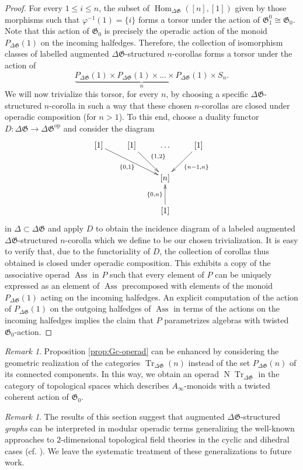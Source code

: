\documentclass[english,11pt,leqno]{article}
\def\Gen{\mathfrak{G}}
\def\Hom{\operatorname{Hom}}
\def\on{\operatorname}
\def\op{{\operatorname{op}}}
\def\Hom{\operatorname{Hom}}
\def\N{\operatorname{N}}
\def\Tr{\on{Tr}}
\def\DG{ {\Delta \Gen}}
\theoremstyle{definition}
\theoremstyle{remark}
\newtheorem{rem}[thm]{Remark}
\numberwithin{equation}{section}
\begin{document}
\begin{proof}
	For every $1 \le i \le n$, the subset of $\Hom_{\DG}([n],[1])$ given by those morphisms such
	that $\varphi^{-1}(1) = \{i\}$ forms a torsor under the action of $\Gen_1^0 \cong \Gen_0$. 
	Note that this action of $\Gen_0$ is precisely the operadic action of the monoid
	$P_{\DG}(1)$ on the incoming halfedges. Therefore, the collection of isomorphism classes of
	labelled augmented $\DG$-structured $n$-corollas forms a torsor under the action of 
	\[
		\underbrace{P_{\DG}(1) \times P_{\DG}(1) \times \dots \times P_{\DG}(1)}_n \times S_{n}.
	\]
	We will now trivialize this torsor, for every $n$, by choosing a specific $\DG$-structured
	$n$-corolla in such a way that these chosen $n$-corollas are closed under operadic
	composition (for $n>1$). To this end, choose a duality functor $D: \DG \to \DG^{\op}$ and consider the
	diagram
	\[
		\xymatrix{ [1] \ar[drr]_{\{0,1\}}& [1] \ar[dr]^{\{1,2\}} & \dots & [1] \ar[dl]^{\{n-1,n\}}\\
			& & [n] & \\
			& & [1]\ar[u]^{\{0,n\}} & 
		}
	\]
	in $\Delta \subset \DG$ and apply $D$ to obtain the incidence diagram of a labeled augmented
	$\DG$-structured $n$-corolla which we define to be our chosen trivialization. It is easy to
	verify that, due to the functoriality of $D$, the collection of corollas thus obtained is
	closed under operadic composition. This exhibits a copy of the associative operad $\on{Ass}$
	in $P$ such that every element of $P$ can be uniquely expressed as an element of $\on{Ass}$
	precomposed with elements of the monoid $P_{\DG}(1)$ acting on the incoming halfedges. An
	explicit computation of the action of $P_{\DG}(1)$ on the outgoing halfedges of $\on{Ass}$
	in terms of the actions on the incoming halfedges implies the claim that $P$ parametrizes
	algebras with twisted $\Gen_0$-action. 
\end{proof}

\begin{rem} Proposition \ref{prop:Gc-operad} can be enhanced by considering the geometric
	realization of the categories $\Tr_\DG(n)$ instead of the set $P_{\DG}(n)$ of its connected
	components. In this way, we obtain an operad $\N\Tr_\DG$ in the category of topological
	spaces which describes $A_\infty$-monoids with a twisted coherent action of $\Gen_0$.  
\end{rem}

\begin{rem} The results of this section suggest that augmented $\DG$-structured {\em graphs} can be
	interpreted in modular operadic terms generalizing the well-known approaches to
	$2$-dimensional topological field theories in the cyclic and dihedral cases (cf. \cite{costello-TFT, braun}). 
	We leave the systematic treatment of these generalizations to future work.
\end{rem}
    
\end{document}
